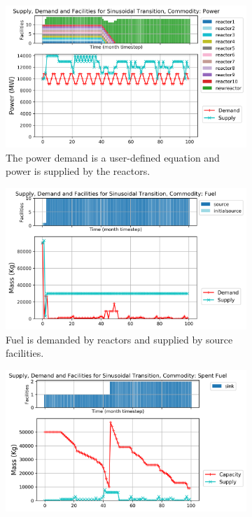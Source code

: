     \begin{figure}[]
        \centering
        \begin{subfigure}[t]{\textwidth}
        \centering
            \includegraphics[width=0.8\linewidth]{figures/sinetransition-power.png} 
            \caption{The power demand is a user-defined equation and power is supplied by the reactors.}
            \label{fig:sinetransition-power}
        \end{subfigure}
        \begin{subfigure}[t]{0.65\textwidth}
            \centering
            \includegraphics[width=\linewidth]{figures/sinetransition-fuel.png} 
            \caption{Fuel is demanded by reactors and supplied by source facilities.}
            \label{fig:sinetransition-fuel}
        \end{subfigure}
        \begin{subfigure}[t]{0.65\textwidth}
            \centering
            \includegraphics[width=\linewidth]{figures/sinetransition-spentfuel.png} 

\end{subfigure}
\end{figure}
